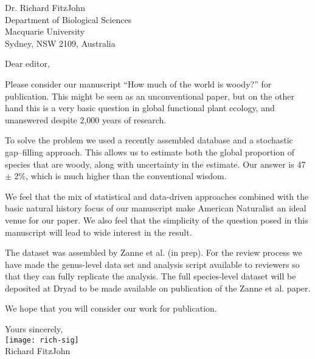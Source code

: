 \documentclass[a4paper,12pt]{article}
\begin{document}
{\raggedleft
  Dr. Richard FitzJohn\\
  Department of Biological Sciences\\
  Macquarie University\\
  Sydney, NSW 2109, Australia\\[2ex]
}

\vspace{3ex}

Dear editor,

Please consider our manuscript ``How much of the world is woody?''
for publication.  This might be seen as an unconventional paper, but
on the other hand this is a very basic question in global functional
plant ecology, and unanswered despite 2,000 years of research.

To solve the problem we used a recently assembled database and a
stochastic gap--filling approach.  This allows us to estimate both the
global proportion of species that are woody, along with uncertainty in
the estimate.  Our answer is 47 $\pm$ 2\%, which is much higher than
the conventional wisdom.

We feel that the mix of statistical and data-driven approaches
combined with the basic natural history focus of our manuscript make
American Naturalist an ideal venue for our paper.  We also feel that
the simplicity of the question posed in this manuscript will lead to
wide interest in the result.

The dataset was assembled by Zanne et al. (in prep).  For the review
process we have made the genus-level data set and analysis script
available to reviewers so that they can fully replicate the analysis.
The full species-level dataset will be deposited at Dryad to be made
available on publication of the Zanne et al. paper.

We hope that you will consider our work for publication.

\vspace{2ex}
\hspace{.2\textwidth}Yours sincerely,\\[2ex]
\hspace*{.2\textwidth}
\texttt{[image: rich-sig]}\\[2ex]
\hspace*{.3\textwidth}
Richard FitzJohn
\end{document}

